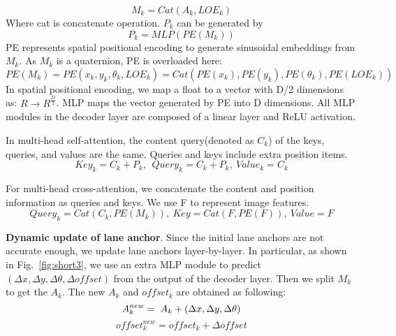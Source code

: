\documentclass{bmvc2k}
\begin{document}
\begin{equation}\label{eqn-1} 
   M_k=Cat\left(A_k,{LOE}_k\right)
 \end{equation}
Where cat is concatenate operation. $P_k$ can be generated by
\begin{equation}\label{eqn-2} 
   P_k=MLP\left(PE\left(M_k\right)\right)  
 \end{equation}
PE represents spatial positional encoding to generate sinusoidal embeddings from $M_k$. As $M_k$ is a quaternion, PE is overloaded here: 
\begin{equation}\label{eqn-3} 
   PE\left(M_k\right)=PE\left(x_k,y_k,\theta_k,{LOE}_k\right)=Cat\left(PE\left(x_k\right),PE\left(y_k\right),PE\left(\theta_k\right),PE\left({LOE}_k\right)\right) 
 \end{equation}
 In spatial positional encoding, we map a float to a vector with D/2 dimensions as: ${R\rightarrow R}^\frac{D}{2}$. 
MLP maps the vector generated by PE into D dimensions. All MLP modules in the decoder layer are composed of a linear layer and ReLU activation. 

In multi-head self-attention, the content query(denoted as $C_k$) of the keys, queries, and values are the same. Queries and keys include extra position items.
\begin{equation}\label{eqn-4} 
   {Key}_k=C_k+P_k,\ \ {Query}_k=C_k+P_k,\ {Value}_k=C_k 
 \end{equation}

For multi-head cross-attention, we concatenate the content and position information as queries and keys. We use F to represent image features.
\begin{equation}\label{eqn-5} 
   {Query}_k=Cat\left(C_k,PE\left(M_k\right)\right),\ {Key}=Cat\left(F,PE\left(F\right)\right),\ {Value}=F
 \end{equation}

{\bf Dynamic update of lane anchor}. Since the initial lane anchors are not accurate enough, we update lane anchors layer-by-layer. 
In particular, as shown in Fig.~\ref{fig:short3}, we use an extra MLP module to predict $\left ( \Delta x,\Delta y, \Delta \theta,\Delta offset \right )$ from the output of the decoder layer. 
Then we split $M_k$ to get the $A_k$. The new $A_k$ and $offset_k$ are obtained as following:
\begin{equation}\label{eqn-6} 
   A_k^{new}=\ A_k+\left ( \Delta x,\Delta y, \Delta \theta \right ) 
   \vspace{-0.39cm}
 \end{equation}
\begin{equation}\label{eqn-7} 
   offset_k^{new}=offset_k + \Delta offset
 \end{equation}
\end{document}

